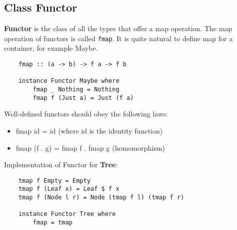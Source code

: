 \subsection{Class Functor}
\textbf{Functor} is the class of all the types that offer a map operation.
The map operation of functors is called \texttt{fmap}.
It is quite natural to define map for a container, for example Maybe.
\begin{lstlisting}
	fmap :: (a -> b) -> f a -> f b
	
	instance Functor Maybe where
		fmap _ Nothing = Nothing
		fmap f (Just a) = Just (f a)
\end{lstlisting}
Well-defined functors should obey the following laws:
\begin{itemize}
	\item fmap id = id (where id is the identity function)
	\item fmap (f . g) = fmap f . fmap g (homomorphism)
\end{itemize}
Implementation of Functor for \textbf{Tree}:
\begin{lstlisting}
	tmap f Empty = Empty
	tmap f (Leaf x) = Leaf $ f x
	tmap f (Node l r) = Node (tmap f l) (tmap f r)
	
	instance Functor Tree where
		fmap = tmap
\end{lstlisting}

